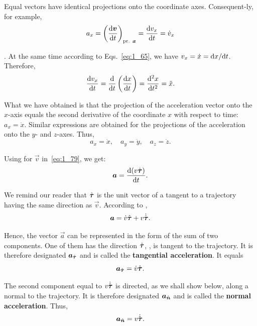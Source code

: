 Equal vectors have identical projections onto the coordinate axes. Consequent-ly, for example,
\begin{equation*}
a_x = \left(\frac{\mathrm{d}\boldsymbol{v}}{\mathrm{d} t}\right)_{\text{pr. }\boldsymbol{x}} = \frac{\mathrm{d} v_x}{\mathrm{d} t} = \dot{v}_x
\end{equation*}

. At the same time according to Eqs.~\eqref{eq:1_65}, we have $v_x=\dot{x}=\mathrm{d} x/\mathrm{d} t$. Therefore,
\begin{equation*}
\frac{\mathrm{d} v_x}{\mathrm{d} t} = \frac{\mathrm{d}}{\mathrm{d}t} \left(\frac{\mathrm{d} x}{\mathrm{d} t}\right) = \frac{\mathrm{d}^2x}{\mathrm{d} t^2} = \ddot{x}.
\end{equation*}

\noindent
What we have obtained is that the projection of the acceleration vector onto the $x$-axis equals the second derivative of the coordinate $x$ with respect to time: $a_x=\ddot{x}$. Similar expressions are obtained for the projections of the acceleration onto the $y$- and $z$-axes. Thus,
\begin{equation}\label{eq:1_80}
a_x=\ddot{x},\quad a_y=\ddot{y},\quad a_z=\ddot{z}.
\end{equation}

Using  for $\vec{v}$ in~\eqref{eq:1_79}, we get:
\begin{equation}\label{eq:1_81}
\boldsymbol{a} = \frac{\mathrm{d}(v\hat{\boldsymbol{\tau}})}{\mathrm{d} t}.
\end{equation}

\noindent
We remind our reader that $\hat{\boldsymbol{\tau}}$ is the unit vector of a tangent to a trajectory having the same direction as $\vec{v}$. According to ,
\begin{equation}\label{eq:1_82}
\boldsymbol{a} = \dot{v}\hat{\boldsymbol{\tau}} + v\dot{\hat{\boldsymbol{\tau}}}.
\end{equation}

\noindent
Hence, the vector $\vec{a}$ can be represented in the form of the sum of two components. One of them has the direction $\hat{\boldsymbol{\tau}}$, \ie, is tangent to the trajectory. It is therefore designated $\boldsymbol{a}_{\hat{\boldsymbol{\tau}}}$ and is called the \textbf{tangential acceleration}. It equals
\begin{equation}\label{eq:1_83}
\boldsymbol{a}_{\hat{\boldsymbol{\tau}}} = \dot{v}\hat{\boldsymbol{\tau}}.
\end{equation}

\noindent
The second component equal to $v\dot{\hat{\boldsymbol{\tau}}}$ is directed, as we shall show below, along a normal to the trajectory. It is therefore designated $\boldsymbol{a}_{\hat{\boldsymbol{n}}}$ and is called the \textbf{normal acceleration}. Thus,
\begin{equation}\label{eq:1_84}
\boldsymbol{a}_{\hat{\boldsymbol{n}}} = v\dot{\hat{\boldsymbol{\tau}}}.
\end{equation}

